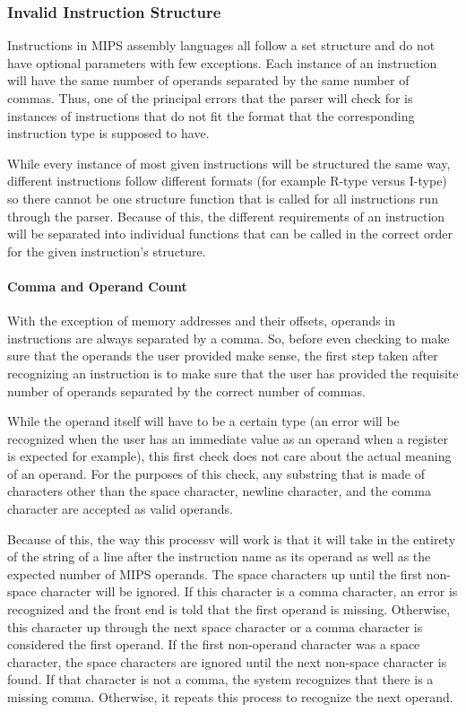 \documentclass[
    paper=letter,
    parskip=half,
    fontsize=12pt,
    titlepage=firstiscover,
    toc=bibliography,
    numbers=endperiod
]{scrartcl}
\begin{document}
\subsubsection{Invalid Instruction Structure}

Instructions in MIPS assembly languages all follow a set structure and
do not have optional parameters with few exceptions. Each instance of an
instruction will have the same number of operands separated by the same
number of commas. Thus, one of the principal errors that the parser will
check for is instances of instructions that do not fit the format that
the corresponding instruction type is supposed to have.

While every instance of most given instructions will be structured the
same way, different instructions follow different formats (for example
R-type versus I-type) so there cannot be one structure function that is
called for all instructions run through the parser. Because of this, the
different requirements of an instruction will be separated into
individual functions that can be called in the correct order for the
given instruction's structure.

\paragraph{Comma and Operand Count}
\label{subsec:comma-and-operand-count}

With the exception of memory addresses and their offsets, operands in
instructions are always separated by a comma. So, before even checking
to make sure that the operands the user provided make sense, the first
step taken after recognizing an instruction is to make sure that the
user has provided the requisite number of operands separated by the
correct number of commas.

While the operand itself will have to be a certain type (an error will
be recognized when the user has an immediate value as an operand when a
register is expected for example), this first check does not care about
the actual meaning of an operand. For the purposes of this check, any
substring that is made of characters other than the space character,
newline character, and the comma character are accepted as valid
operands.

Because of this, the way this processv will work is that it will take in
the entirety of the string of a line after the instruction name as its
operand as well as the expected number of MIPS operands. The space
characters up until the first non-space character will be ignored. If
this character is a comma character, an error is recognized and the
front end is told that the first operand is missing. Otherwise, this
character up through the next space character or a comma character is
considered the first operand. If the first non-operand character was a
space character, the space characters are ignored until the next
non-space character is found. If that character is not a comma, the
system recognizes that there is a missing comma. Otherwise, it repeats
this process to recognize the next operand.
\end{document}
